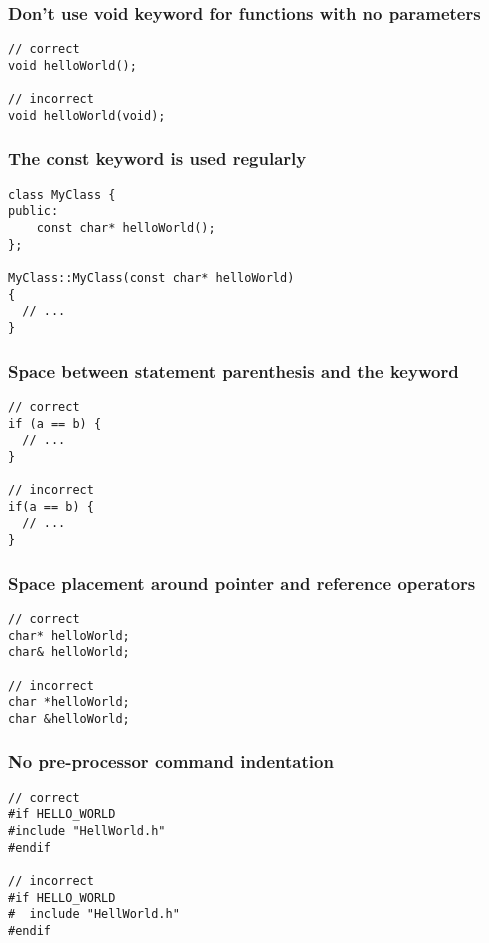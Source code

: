 \subsubsection{Don't use void keyword for functions with no parameters}

\begin{verbatim}
// correct
void helloWorld();

// incorrect
void helloWorld(void);
\end{verbatim}

\subsubsection{The const keyword is used regularly}

\begin{verbatim}
class MyClass {
public:
    const char* helloWorld();
};

MyClass::MyClass(const char* helloWorld)
{
  // ...
}
\end{verbatim}

\subsubsection{Space between statement parenthesis and the keyword}

\begin{verbatim}
// correct
if (a == b) {
  // ...
}

// incorrect
if(a == b) {
  // ...
}
\end{verbatim}

\subsubsection{Space placement around pointer and reference operators}

\begin{verbatim}
// correct
char* helloWorld;
char& helloWorld;

// incorrect
char *helloWorld;
char &helloWorld;
\end{verbatim}

\subsubsection{No pre-processor command indentation}

\begin{verbatim}
// correct
#if HELLO_WORLD
#include "HellWorld.h"
#endif

// incorrect
#if HELLO_WORLD
#  include "HellWorld.h"
#endif
\end{verbatim}

